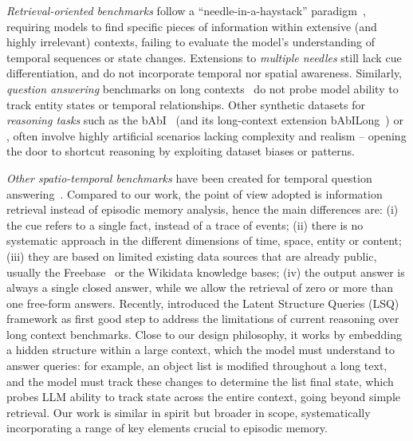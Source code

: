 \documentclass{article}
\begin{document}
\textit{Retrieval-oriented benchmarks} follow a ``needle-in-a-haystack'' paradigm~\citep{Kamradt2023}, requiring models 
to find specific pieces of information within extensive 
(and highly irrelevant) contexts, failing to evaluate the model's understanding of temporal sequences or state changes.
Extensions to  \textit{multiple needles} \citep{reid2024gemini, Hsieh2024, Li2024, Zhang2024Bench} still lack cue differentiation, and do not incorporate  temporal nor spatial awareness.  
Similarly, \textit{question answering} benchmarks on  long contexts~\citep{bohnet2024long, Zhang2024Bench}  do not probe model ability to track entity states or temporal relationships. Other synthetic datasets for \textit{reasoning tasks} such as the bAbI~\citep{weston2015towards_babi} (and its long-context extension bAbILong~\citep{kuratov2024babilong}) or \citet{Li2024}, often involve highly artificial scenarios lacking complexity and realism -- opening the door to shortcut reasoning by exploiting dataset biases or patterns.

\textit{Other spatio-temporal benchmarks} have been created for temporal question answering~\citep{jia2018tempquestions, saxena2021question, dhingra2022time, chen2021dataset, kasai2024realtime, tan2023towards}. Compared to our work, the point of view adopted is information retrieval instead of episodic memory analysis, hence the main differences are: (i) the cue refers to a single fact, instead of a trace of events; (ii) there is no systematic approach in the different dimensions of time, space, entity or content; (iii) they are based on limited existing data sources that are already public, usually the Freebase~\citep{bollacker2008freebase} or the Wikidata knowledge bases;  (iv) the output answer is always a single closed answer, while we allow the retrieval of zero or more than one free-form answers.
Recently, \citet{vodrahalli2024michelangelo} introduced the Latent Structure Queries (LSQ) framework as first good step to address the limitations of current reasoning over long context benchmarks.  Close to our design philosophy, it works by embedding a hidden structure within a large context, which the model must understand to answer queries: for example, an object list is modified throughout a long text, and the model must track these changes to determine the list final state, which probes LLM ability to track state across the entire context, going beyond simple retrieval. 
Our work is similar in spirit but broader in scope,  systematically incorporating a range of key elements crucial to episodic memory.
\end{document}

